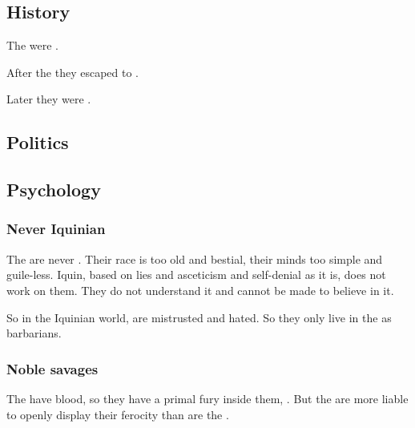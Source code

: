 \subsection{History}
The \cregorrs{} were . 

After the \firstbanewar{} they escaped to . 

Later they were . 









\subsection{Politics}










\subsection{Psychology}





\subsubsection{Never Iquinian}
The \cregorrs{} are never . 
Their race is too old and bestial, their minds too simple and guile-less. 
Iquin, based on lies and asceticism and self-denial as it is, does not work on them. 
They do not understand it and cannot be made to believe in it. 

So in the Iquinian world, \cregorrs{} are mistrusted and hated. 
So they only live in the \wylde{} as barbarians. 





\subsubsection{Noble savages}
The \cregorrs{} have \xsic{} blood, so they have a primal fury inside them, . 
But the \cregorrs{} are more liable to openly display their ferocity than are the \scathae. 

